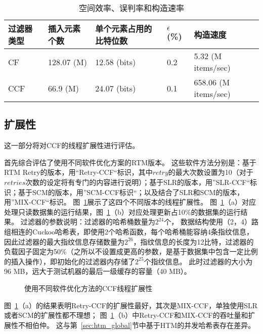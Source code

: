 \begin{table}[htbp]
  \centering
  \caption{空间效率、误判率和构造速率}
  \label{tab:cf_space}
  \begin{tabular}{lllll}
    \toprule
      过滤器类型  & 插入元素个数 & 单个元素占用的比特位数 & $\epsilon$ (\%) &  构造速度  \\
    \midrule
      CF   &  128.07 (M) & 12.58 (bits) &  0.2       &  5.32 (M items/sec)  \\
      CCF  &  66.9 (M)  & 24.07 (bits)  &  0.1       &  658.06 (M items/sec) \\
    \bottomrule
  \end{tabular}
\end{table}

\subsection{扩展性}
这一部分将对CCF的线程扩展性进行评估。

首先综合评估了使用不同软件优化方案的RTM版本。
这些软件方法分别是：基于RTM Retry的版本，用“Retry-CCF“标识，其中$retry$的最大次数设置为10（对于$retries$次数的设定将有专门的内容进行说明）；基于SLR的版本，用”SLR-CCF“标识；基于SCM的版本，用”SCM-CCF标识“；以及结合了SLR和SCM的版本，用”MIX-CCF“标识。
图~\ref{fig:cf-locks}展示了这四个不同版本的线程扩展性。
图~\ref{fig:cf-locks}（a）对应处理只读数据集的运行结果，图~\ref{fig:cf-locks}（b）对应处理更新占10\%的数据集的运行结果。
过滤器的参数说明：过滤器的哈希桶数量为$2^{24}$个，
数据结构使用（2，4）路组相连的Cuckoo哈希表，即使用2个哈希函数，每个哈希桶能容纳4条指纹信息，因此过滤器的最大指纹信息存储数量为$2^{26}$，指纹信息的长度为12比特，过滤器的负载因子固定为50\%（之所以不设置成更高的参数，是基于数据集中包含一定比例的插入操作），即初始化的过滤器内存储了$2^{25}$个指纹信息。
此时过滤器的大小为96 MB，远大于测试机器的最后一级缓存的容量（40 MB）。

\begin{figure}[htbp]
\centering
\caption{使用不同软件优化方法的CCF线程扩展性}
\label{fig:cf-locks}
\end{figure}
图~\ref{fig:cf-locks}（a）的结果表明Retry-CCF的扩展性最好，其次是MIX-CCF，单独使用SLR或者SCM的扩展性都不理想；
图~\ref{fig:cf-locks}（b）中Retry-CCF和MIX-CCF的吞吐量和扩展性不相伯仲。
这与第~\ref{sec:htm_global}节中基于HTM的并发哈希表存在差异。

